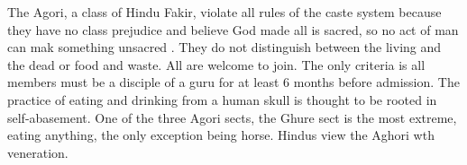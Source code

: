 \documentclass[a4paper,11pt]{article}
\begin{document}
The Agori, a class of Hindu Fakir, violate all rules of the caste system because they have no class prejudice and believe God made all is sacred, so no act of man can mak something unsacred \cite{balfour1897life}. They do not distinguish between the living and the dead or food and waste. All are welcome to join. The only criteria is all members must be a disciple of a guru for at least 6 months before admission. The practice of eating and drinking from a human skull is thought to be rooted in self-abasement. One of the three Agori sects, the Ghure sect is the most extreme, eating anything, the only exception being horse. Hindus view the Aghori wth veneration. 





\newpage
\end{document}
